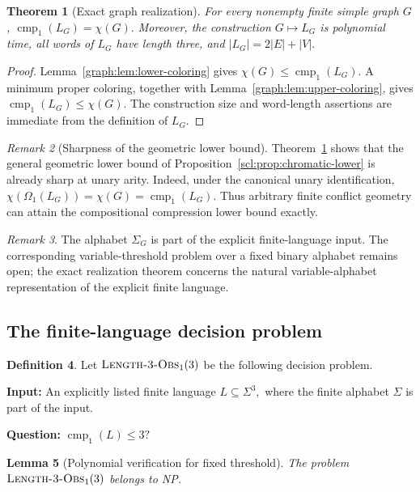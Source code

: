 \documentclass[10pt,a4paper]{article}
\newtheorem{theorem}{Theorem}[section]
\newtheorem{lemma}[theorem]{Lemma}
\theoremstyle{definition}
\newtheorem{definition}[theorem]{Definition}
\theoremstyle{remark}
\newtheorem{remark}[theorem]{Remark}
\newcommand{\cmp}{\operatorname{cmp}}
\newcommand{\Om}{\Omega}
\begin{document}
\begin{theorem}[Exact graph realization]
\label{graph:thm:graph-realization}
For every nonempty finite simple graph \(G\), \(\cmp_1(L_G)=\chi(G).\) Moreover, the construction \(G\mapsto L_G\) is polynomial time, all words of
\(L_G\) have length three, and \(|L_G|=2|E|+|V|.\) \end{theorem}

\begin{proof}
Lemma~\ref{graph:lem:lower-coloring} gives \(\chi(G)\le\cmp_1(L_G).\) A minimum proper coloring, together with
Lemma~\ref{graph:lem:upper-coloring}, gives \(\cmp_1(L_G)\le\chi(G).\) The construction size and word-length assertions are immediate from the
definition of \(L_G\).
\end{proof}

\begin{remark}[Sharpness of the geometric lower bound]
Theorem~\ref{graph:thm:graph-realization} shows that the general geometric
lower bound of Proposition~\ref{scl:prop:chromatic-lower} is already sharp
at unary arity.  Indeed, under the canonical unary identification,
\(\chi(\Om_1(L_G))=\chi(G)=\cmp_1(L_G).\)
Thus arbitrary finite conflict geometry can attain the compositional
compression lower bound exactly.
\end{remark}

\begin{remark}
The alphabet \(\Sigma_G\) is part of the explicit finite-language input. The
corresponding variable-threshold problem over a fixed binary alphabet remains
open; the exact realization theorem concerns the natural variable-alphabet
representation of the explicit finite language.
\end{remark}

\subsection{The finite-language decision problem}

\begin{definition}
Let \({\normalfont\textsc{Length-3-Obs}}_1(3)\) be the following decision problem.

\medskip
\noindent
\textbf{Input:} An explicitly listed finite language \(L\subseteq\Sigma^3,\) where the finite alphabet \(\Sigma\) is part of the input.

\noindent
\textbf{Question:} \(\cmp_1(L)\le3?\) \end{definition}

\begin{lemma}[Polynomial verification for fixed threshold]
\label{graph:lem:np}
The problem
\(
{\normalfont\textsc{Length-3-Obs}}_1(3)
\)
belongs to NP.
\end{lemma}
\end{document}
